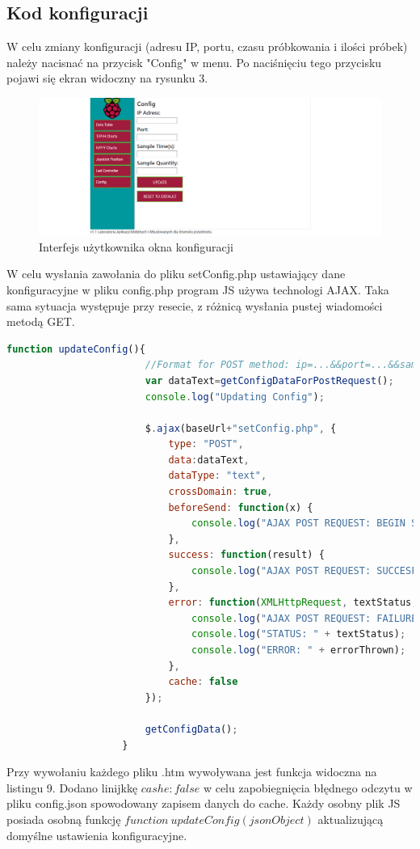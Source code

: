 \documentclass{article}
\begin{document}
			\subsection{Kod konfiguracji}
				W celu zmiany konfiguracji (adresu IP, portu, czasu próbkowania  i ilości próbek) należy nacisnać na przycisk "Config" w menu. Po naciśnięciu tego przycisku pojawi się ekran widoczny na rysunku 3.
				\begin{figure}[!h]
					\includegraphics[width=\textwidth]{webUI_config}
					\caption{Interfejs użytkownika okna konfiguracji}
				\end{figure}
				W celu wysłania zawołania do pliku setConfig.php ustawiający dane konfiguracyjne w pliku config.php program JS używa technologi AJAX. Taka sama sytuacja występuje przy resecie, z różnicą wysłania pustej wiadomości metodą GET.
				\begin{lstlisting}[caption={Kod config.js}, language=JavaScript, firstnumber=58]
					function updateConfig(){
						//Format for POST method: ip=...&&port=...&&sampleTime=...&&sampleQuantity=...
						var dataText=getConfigDataForPostRequest();
						console.log("Updating Config");
						
						$.ajax(baseUrl+"setConfig.php", {
							type: "POST",
							data:dataText,
							dataType: "text",
							crossDomain: true,
							beforeSend: function(x) {
								console.log("AJAX POST REQUEST: BEGIN SENDING");
							},
							success: function(result) {
								console.log("AJAX POST REQUEST: SUCCESFULL CODE: " + result);
							},
							error: function(XMLHttpRequest, textStatus, errorThrown) {
								console.log("AJAX POST REQUEST: FAILURE");
								console.log("STATUS: " + textStatus);
								console.log("ERROR: " + errorThrown);
							},
							cache: false
						});
						
						getConfigData();
					}
				\end{lstlisting}
				Przy wywołaniu każdego pliku .htm wywoływana jest funkcja widoczna na listingu 9. Dodano linijkkę $cashe: false$ w celu zapobiegnięcia błędnego odczytu w pliku config.json spowodowany zapisem danych do cache. Każdy osobny plik JS posiada osobną funkcję $function\ updateConfig(jsonObject)$ aktualizującą domyślne ustawienia konfiguracyjne.
\end{document}

